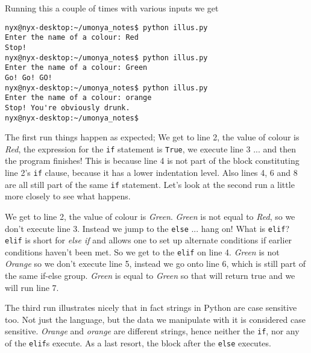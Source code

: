 Running this a couple of times with various inputs we get
\begin{lstlisting}
nyx@nyx-desktop:~/umonya_notes$ python illus.py 
Enter the name of a colour: Red
Stop!
nyx@nyx-desktop:~/umonya_notes$ python illus.py 
Enter the name of a colour: Green
Go! Go! GO!
nyx@nyx-desktop:~/umonya_notes$ python illus.py 
Enter the name of a colour: orange
Stop! You're obviously drunk.
nyx@nyx-desktop:~/umonya_notes$
\end{lstlisting}

The first run things happen as expected; We get to line 2, the value   of colour is \textit{Red}, the expression for the \texttt{if} statement is \texttt{True},   we execute line 3 ... and then the program finishes! This is because   line 4 is not part of the block constituting line 2's \texttt{if} clause,   because it has a lower indentation level. Also lines 4, 6 and 8 are   all still part of the same \texttt{if} statement. Let's look at the second run a   little more closely to see what happens.

We get to line 2, the value of colour is \textit{Green}.   \textit{Green} is not equal to \textit{Red}, so we don't execute line   3. Instead we jump to the \texttt{else} ... hang on! What is \texttt{elif}? \texttt{elif} is   short for \textit{else if} and allows one to set up alternate conditions if   earlier conditions haven't been met. So we get to the \texttt{elif} on line 4.   \textit{Green} is not \textit{Orange} so we don't execute line 5, instead we go onto line 6, which is still part of the same if-else group. \textit{Green} is equal to \textit{Green} so that will return true and we will run line 7.

The third run illustrates nicely that in fact strings in Python are   case sensitive too. Not just the language, but the data we manipulate   with it is considered case sensitive. \textit{Orange} and \textit{orange} are different   strings, hence neither the \texttt{if}, nor any of the \texttt{elif}s execute. As a last resort, the block after the \texttt{else} executes.

